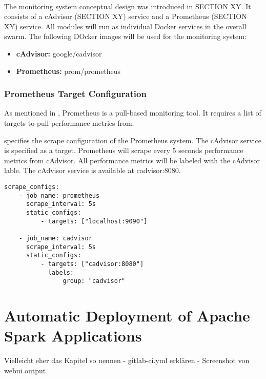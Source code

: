 \paragraph{}The monitoring system conceptual design was introduced in SECTION XY.
It consists of a cAdvisor (SECTION XY) service and a Prometheus (SECTION XY) service.
All modules will run as individual Docker services in the overall swarm.
The following DOcker images will be used for the monitoring system:
\begin{itemize}
\item \textbf{cAdvisor:} google/cadvisor
\item \textbf{Prometheus:} prom/prometheus
\end{itemize}

\subsubsection{Prometheus Target Configuration}
As mentioned in , Prometheus is a pull-based monitoring tool.
It requires a list of targets to pull performance metrics from.


 specifies the scrape configuration of the Prometheus system.
The cAdvisor service is specified as a target. Prometheus will scrape every 5 seconds performance metrics from cAdvisor. All performance metrics will be labeled with the cAdvisor lable. The cAdvisor service is available at  cadvisor:8080.


\begin{lstlisting}[label=lst:06_computing_am_prom-config, caption=Prometheus target configuration in YAML syntax]
scrape_configs:
    - job_name: prometheus
      scrape_interval: 5s
      static_configs:
          - targets: ["localhost:9090"]
 
    - job_name: cadvisor
      scrape_interval: 5s
      static_configs:
          - targets: ["cadvisor:8080"]
            labels:
                group: "cadvisor"
\end{lstlisting}


\section{Automatic Deployment of Apache Spark Applications}
Vielleicht eher das Kapitel so nennen
- gitlab-ci.yml erklären
- Screenshot von webui output

